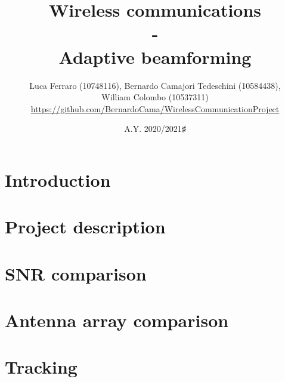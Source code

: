 \documentclass{article} %
\title{\textbf{\huge{Wireless communications \\ 
                             - \\ 
                    Adaptive beamforming}}}
\author{Luca Ferraro (10748116), Bernardo Camajori Tedeschini (10584438), \\
            William Colombo (10537311)\\ 
\textcolor{url_blue}{\url{https://github.com/BernardoCama/WirelessCommunicationProject}}}
\date{A.Y. 2020/2021♯}
\begin{document}

\begin{titlingpage}
    \maketitle
\end{titlingpage}

\newpage{}

\tableofcontents
\listoffigures
\newpage{}

\clearpage
\section{Introduction}
\label{sec:introduction}


\clearpage
\section{Project description}
\label{sec:project}


\clearpage
\section{SNR comparison}
\label{sec:snr_comparison}


\clearpage
\section{Antenna array comparison}
\label{sec:antenna_array_comparison}


\clearpage
\section{Tracking}
\label{sec:tracking}

\end{document}
